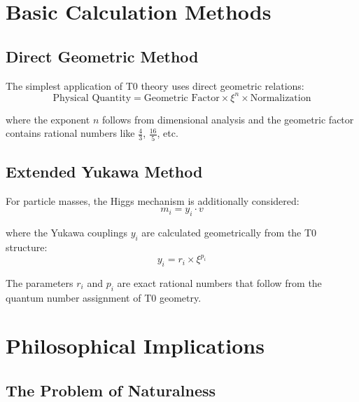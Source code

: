 \documentclass[12pt,a4paper]{article}
\begin{document}
	\section{Basic Calculation Methods}
	
	\subsection{Direct Geometric Method}
	
	The simplest application of T0 theory uses direct geometric relations:
	\begin{equation}
		\text{Physical Quantity} = \text{Geometric Factor} \times \xi^n \times \text{Normalization}
		\label{eq:direct_method}
	\end{equation}
	
	where the exponent $n$ follows from dimensional analysis and the geometric factor contains rational numbers like $\frac{4}{3}$, $\frac{16}{5}$, etc.
	
	\subsection{Extended Yukawa Method}
	
	For particle masses, the Higgs mechanism is additionally considered:
	\begin{equation}
		m_i = y_i \cdot v
		\label{eq:yukawa_method}
	\end{equation}
	
	where the Yukawa couplings $y_i$ are calculated geometrically from the T0 structure:
	\begin{equation}
		y_i = r_i \times \xi^{p_i}
		\label{eq:yukawa_coupling}
	\end{equation}
	
	The parameters $r_i$ and $p_i$ are exact rational numbers that follow from the quantum number assignment of T0 geometry.
	
	\section{Philosophical Implications}
	
	\subsection{The Problem of Naturalness}
	
\end{document}
